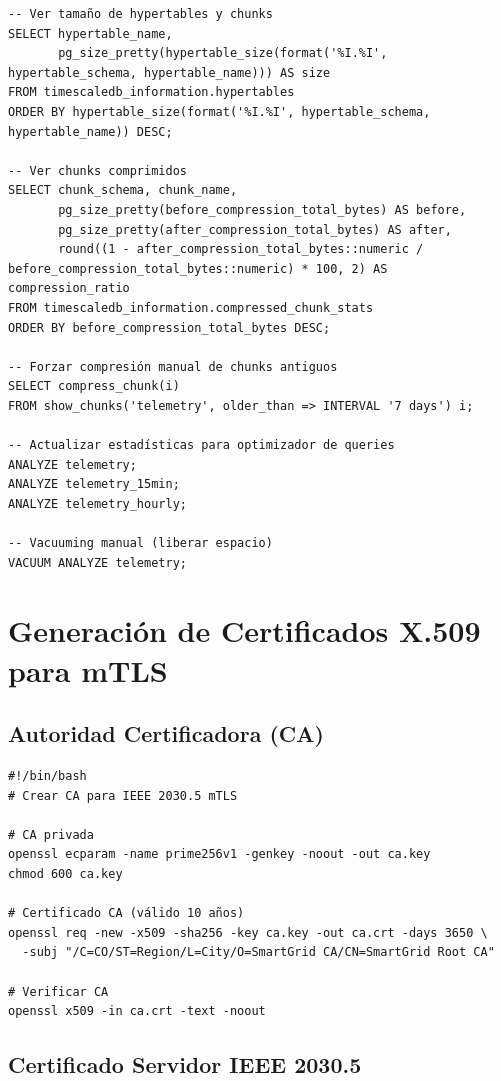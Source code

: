 \begin{verbatim}
-- Ver tamaño de hypertables y chunks
SELECT hypertable_name, 
       pg_size_pretty(hypertable_size(format('%I.%I', hypertable_schema, hypertable_name))) AS size
FROM timescaledb_information.hypertables
ORDER BY hypertable_size(format('%I.%I', hypertable_schema, hypertable_name)) DESC;

-- Ver chunks comprimidos
SELECT chunk_schema, chunk_name, 
       pg_size_pretty(before_compression_total_bytes) AS before,
       pg_size_pretty(after_compression_total_bytes) AS after,
       round((1 - after_compression_total_bytes::numeric / before_compression_total_bytes::numeric) * 100, 2) AS compression_ratio
FROM timescaledb_information.compressed_chunk_stats
ORDER BY before_compression_total_bytes DESC;

-- Forzar compresión manual de chunks antiguos
SELECT compress_chunk(i) 
FROM show_chunks('telemetry', older_than => INTERVAL '7 days') i;

-- Actualizar estadísticas para optimizador de queries
ANALYZE telemetry;
ANALYZE telemetry_15min;
ANALYZE telemetry_hourly;

-- Vacuuming manual (liberar espacio)
VACUUM ANALYZE telemetry;
\end{verbatim}

\section{Generación de Certificados X.509 para mTLS}

\subsection{Autoridad Certificadora (CA)}

\begin{verbatim}
#!/bin/bash
# Crear CA para IEEE 2030.5 mTLS

# CA privada
openssl ecparam -name prime256v1 -genkey -noout -out ca.key
chmod 600 ca.key

# Certificado CA (válido 10 años)
openssl req -new -x509 -sha256 -key ca.key -out ca.crt -days 3650 \
  -subj "/C=CO/ST=Region/L=City/O=SmartGrid CA/CN=SmartGrid Root CA"

# Verificar CA
openssl x509 -in ca.crt -text -noout
\end{verbatim}

\subsection{Certificado Servidor IEEE 2030.5}

